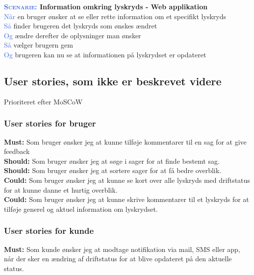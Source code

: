 \textbf{\textsc{\textcolor{RoyalBlue}{Scenarie:}} Information omkring lyskryds - Web applikation}\\
\textcolor{RoyalBlue}{Når} en bruger ønsker at se eller rette information om et specifikt lyskryds\\
\textcolor{RoyalBlue}{Så} finder brugeren det lyskryds som ønskes ændret\\
\textcolor{RoyalBlue}{Og} ændre derefter de oplysninger man ønsker\\
\textcolor{RoyalBlue}{Så} vælger brugern gem\\
\textcolor{RoyalBlue}{Og} brugeren kan nu se at informationen på lyskrydset 
er opdateret\\


\subsection{User stories, som ikke er beskrevet videre}
Prioriteret efter MoSCoW

\subsubsection{User stories for bruger}
\textbf{Must:} Som bruger ønsker jeg at kunne tilføje kommentarer til en sag for at give feedback\\
\textbf{Should:} Som bruger ønsker jeg at søge i sager for at finde bestemt sag.\\
\textbf{Should:} Som bruger ønsker jeg at sortere sager for at få bedre overblik.\\
\textbf{Could:}  Som bruger ønsker jeg at kunne se kort over alle lyskryds med driftstatus for at kunne danne et hurtig overblik.\\
\textbf{Could:} Som bruger ønsker jeg at kunne skrive kommentarer til et lyskryds for at tilføje generel og aktuel information om lyskrydset.

\subsubsection{User stories for kunde}
\textbf{Must:} Som kunde ønsker jeg at modtage notifikation via mail, SMS eller app, når der sker en ændring af driftstatus for at blive opdateret på den aktuelle status.

